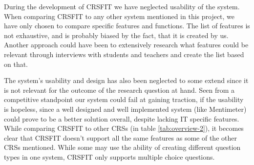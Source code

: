 During the development of CRSFIT we have neglected usability of the system. When comparing CRSFIT to any other system mentioned in this project, we have only chosen to compare specific features and functions. The list of features is not exhaustive, and is probably biased by the fact, that it is created by us. Another approach could have been to extensively research what features could be relevant through interviews with students and teachers and create the list based on that.

The system's usability and design has also been neglected to some extend since it is not relevant for the outcome of the research question at hand. Seen from a competitive standpoint our system could fail at gaining traction, if the usability is hopeless, since a well designed and well implemented system (like Mentimeter) could prove to be a better solution overall, despite lacking IT specific features. While comparing CRSFIT to other CRSs (in table \ref{tab:overview-2}), it becomes clear that CRSFIT doesn't support all the same features as some of the other CRSs mentioned. While some may use the ability of creating different question types in one system, CRSFIT only supports multiple choice questions. 








